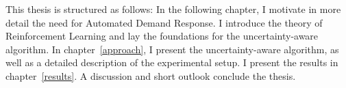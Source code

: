 This thesis is structured as follows: In the following chapter, I motivate in more detail the need for Automated Demand Response. I introduce the theory of Reinforcement Learning and lay the foundations for the uncertainty-aware algorithm.
In chapter~\ref{approach}, I present the uncertainty-aware algorithm, as well as a detailed description of the experimental setup.
I present the results in chapter~\ref{results}. A discussion and short outlook conclude the thesis.


 
